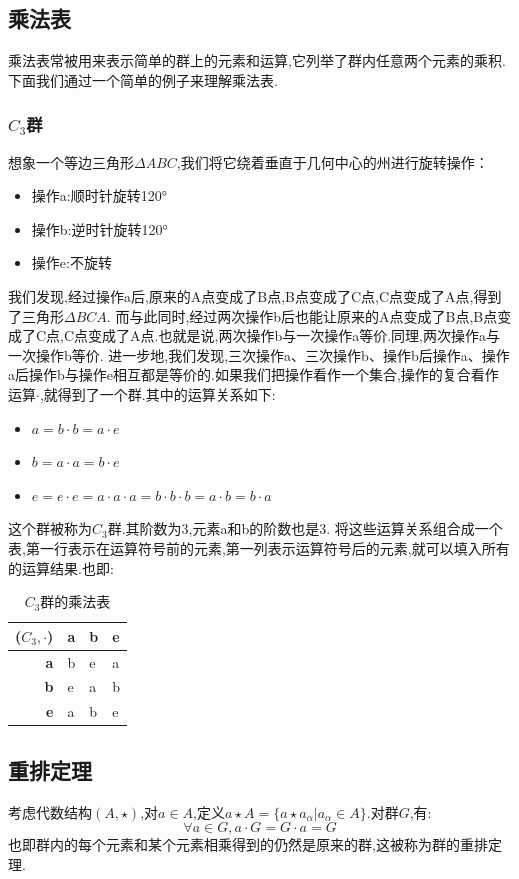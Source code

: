 \documentclass[12pt, a4paper, oneside]{ctexbook}
\begin{document}
  \subsection{乘法表}
  乘法表常被用来表示简单的群上的元素和运算,它列举了群内任意两个元素的乘积.下面我们通过一个简单的例子来理解乘法表.
  \subsubsection{$C_3$群}\label{myref:C_3}
  想象一个等边三角形$\Delta ABC$,我们将它绕着垂直于几何中心的州进行旋转操作：
  \begin{itemize}
    \item 操作a:顺时针旋转120°
    \item 操作b:逆时针旋转120°
    \item 操作e:不旋转
  \end{itemize}
  我们发现,经过操作a后,原来的A点变成了B点,B点变成了C点,C点变成了A点,得到了三角形$\Delta BCA$.
  而与此同时,经过两次操作b后也能让原来的A点变成了B点,B点变成了C点,C点变成了A点.也就是说,两次操作b与一次操作a等价.同理,两次操作a与一次操作b等价.
  进一步地,我们发现,三次操作a、三次操作b、操作b后操作a、操作a后操作b与操作e相互都是等价的.如果我们把操作看作一个集合,操作的复合看作运算$\cdot $,就得到了一个群.其中的运算关系如下:
    \begin{itemize}
    \item $a=b\cdot b=a\cdot e$
    \item $b=a\cdot a=b\cdot e$
    \item $e=e\cdot e=a\cdot a\cdot a=b\cdot b\cdot b=a\cdot b=b\cdot a$
    \end{itemize}
  这个群被称为$C_3$群.其阶数为3,元素a和b的阶数也是3.
  将这些运算关系组合成一个表,第一行表示在运算符号前的元素,第一列表示运算符号后的元素,就可以填入所有的运算结果.也即:
  \begin{table}[!h]
    \centering
    \begin{tabular}{r|lll}
         ($C_3,\cdot$) & \textbf{a} & \textbf{b} & \textbf{e} \\ \hline
        \textbf{a} & b & e & a \\ 
        \textbf{b} & e & a & b \\ 
        \textbf{e} & a & b & e \\ 
    \end{tabular}
    \caption{$C_3$群的乘法表}
    \label{C_3times}
  \end{table}
  \subsection{重排定理}
  考虑代数结构$(A,\star)$,对$a\in A$,定义$a\star A=\{ a\star a_\alpha|a_\alpha \in A \}$.对群$G$,有:
  $$
  \forall a\in G,a\cdot G=G\cdot a=G
  $$也即群内的每个元素和某个元素相乘得到的仍然是原来的群,这被称为群的重排定理.
\end{document}
